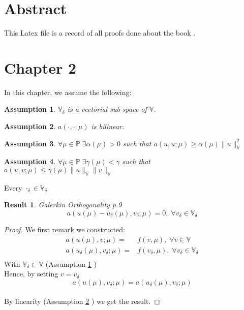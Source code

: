 \documentclass{article}
\newtheorem{assum}{Assumption}
\newtheorem{result}{Result}
\begin{document}
\section*{Abstract}
This Latex file is a record of all proofs done about the book \cite{hesthaven2016certified}.

\section*{Chapter 2}
In this chapter, we assume the following:

\begin{assum}\label{assum:Vvect}
$\mathbb{V} _\delta$ is a vectorial sub-space of $\mathbb{V}$.
\end{assum}

\begin{assum}\label{assum:linear}
$a(\cdot ,\cdot ;\mu )$ is bilinear.
\end{assum}

\begin{assum}\label{assum:coerc}
$\forall \mu \in \mathbb{P}\; \exists \alpha (\mu )> 0$ such that $a(u,u;\mu )\geq \alpha (\mu )\|u\|_\mathbb{V}^2$
\end{assum}

\begin{assum}\label{assum:cont}
$\forall \mu \in \mathbb{P}\; \exists \gamma(\mu )<\gamma $ such that $a(u,v;\mu )\leq \gamma (\mu )\|u\|_\mathbb{V}\|v\|_\mathbb{V}$
\end{assum}

Every $\cdot _\delta \in \mathbb{V} _\delta$

\begin{result}{Galerkin Orthogonality p.9}\label{Galer_Orth}
$$ a\left( u(\mu )-u_\delta (\mu ),v_\delta ;\mu \right) = 0, \; \forall v_\delta  \in \mathbb{V}_\delta $$
\end{result}

\begin{proof}
We first remark we constructed:
\begin{align*}
a\left ( u(\mu ),v;\mu \right ) =& f(v,\mu ), \; \forall v \in \mathbb{V}\\
a\left ( u_\delta (\mu ),v_\delta ;\mu \right ) =& f(v_\delta ,\mu ), \; \forall v_\delta  \in \mathbb{V}_\delta \\
\end{align*}
With $\mathbb{V}_\delta  \subset \mathbb{V}$ (Assumption \ref{assum:Vvect} )\\
Hence, by setting $v=v_\delta $\\
$$a\left ( u(\mu ),v_\delta ;\mu \right ) = a\left ( u_\delta (\mu ),v_\delta ;\mu \right )$$\\
By linearity (Assumption \ref{assum:linear} ) we get the result.
\end{proof}
\end{document}
